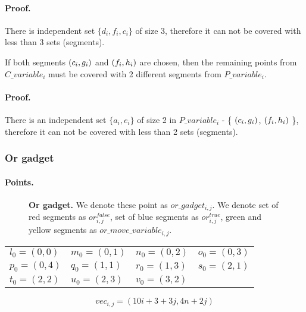 \paragraph{Proof.}
There is independent set $\{d_i, f_i, c_i\}$ of size 3, therefore it can
not be covered with less than 3 sets (segments).


\begin{lemma}
\label{choose_variables_both}
If both segments $(c_i, g_i)$ and $(f_i, h_i)$ are chosen, then
the remaining points from $C\_variable_i$ must be covered with 2 different
segments from $P\_variable_i$.
\end{lemma}
\paragraph{Proof.}
There is an independent set $\{a_i, e_i\}$ of size 2
in $P\_variable_i$ - \{ $(c_i, g_i)$, $(f_i, h_i)$ \},
therefore it can not be covered with less than 2 sets (segments).


\subsubsection{Or gadget}

\paragraph{Points.}

\begin{figure}[h]
\centering
\def\svgwidth{0.5\columnwidth}

\caption{
\textbf{Or gadget.} We denote these point as $or\_gadget_{i, j}$. 
We denote set of red segments as $or^{false}_{i, j}$,
set of blue segments as $or^{true}_{i, j}$,
green and yellow segments as $or\_move\_variable_{i, j}$.
}
\label{fig:apx_or_gadget}
\end{figure}

	\begin{center}
\begin{tabular}{ l l l l}

	$l_0 = (0, 0)$ &
	$m_0 = (0, 1)$ &
	$n_0 = (0, 2)$ &
	$o_0 = (0, 3)$ \\
	$p_0 = (0, 4)$ &
	$q_0 = (1, 1)$ &
	$r_0 = (1, 3)$ &
	$s_0 = (2, 1)$ \\
	$t_0 = (2, 2)$ &
	$u_0 = (2, 3)$ &
	$v_0 = (3, 2)$ &
\end{tabular}
\end{center}


	$$vec_{i, j} = (10i + 3 + 3j, 4n + 2j)$$
	
